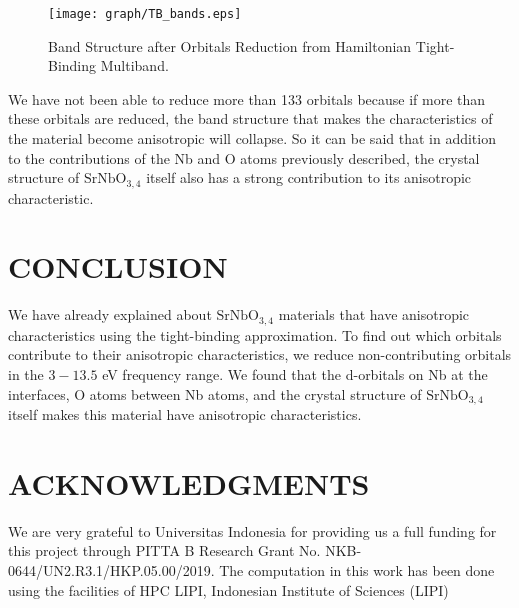 \documentclass{aip-cp}
\begin{document}
\begin{figure}[t]
  \centerline{\texttt{[image: graph/TB\_bands.eps]}}
  \caption{Band Structure after Orbitals Reduction from Hamiltonian Tight-Binding Multiband.}
\end{figure}

We have not been able to reduce more than 133 orbitals because if more than these orbitals are reduced, the band structure that makes the characteristics of the material become anisotropic will collapse. So it can be said that in addition to the contributions of the Nb and O atoms previously described, the crystal structure of $ \mathrm{SrNbO_{3,4}} $ itself also has a strong contribution to its anisotropic characteristic.

\section{CONCLUSION}
We have already explained about $\mathrm{SrNbO_{3,4}}$ materials that have anisotropic characteristics using the tight-binding approximation. To find out which orbitals contribute to their anisotropic characteristics, we reduce non-contributing orbitals in the $ 3-13.5$ eV frequency range. We found that the d-orbitals on Nb at the interfaces, O atoms between Nb atoms, and the crystal structure of $ \mathrm{SrNbO_{3,4}} $ itself makes this material have anisotropic characteristics.


\section{ACKNOWLEDGMENTS}
We are very grateful to Universitas Indonesia for providing us a full funding for this project through PITTA B Research Grant No. NKB-0644/UN2.R3.1/HKP.05.00/2019. The computation in this work has been done using the facilities of HPC LIPI,
Indonesian Institute of Sciences (LIPI)


\nocite{*}
%
%
\end{document}
